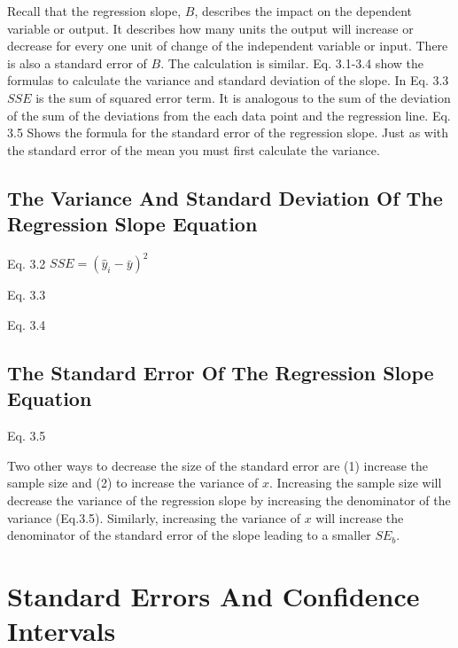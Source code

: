 \documentclass[]{book}
\theoremstyle{definition}
\theoremstyle{definition}
\theoremstyle{definition}
\theoremstyle{remark}
\begin{document}
Recall that the regression slope, \(B\), describes the impact on the
dependent variable or output. It describes how many units the output
will increase or decrease for every one unit of change of the
independent variable or input. There is also a standard error of \(B\).
The calculation is similar. Eq. 3.1-3.4 show the formulas to calculate
the variance and standard deviation of the slope. In Eq. 3.3 \(SSE\) is
the sum of squared error term. It is analogous to the sum of the
deviation of the sum of the deviations from the each data point and the
regression line. Eq. 3.5 Shows the formula for the standard error of the
regression slope. Just as with the standard error of the mean you must
first calculate the variance.

\hypertarget{the-variance-and-standard-deviation-of-the-regression-slope-equation}{%
\subsection{The Variance And Standard Deviation Of The Regression Slope
Equation}\label{the-variance-and-standard-deviation-of-the-regression-slope-equation}}

Eq. 3.2 \(SSE = ({\hat{y}_i} - \bar{y})^2\)

Eq. 3.3

Eq. 3.4

\hypertarget{the-standard-error-of-the-regression-slope-equation}{%
\subsection{The Standard Error Of The Regression Slope
Equation}\label{the-standard-error-of-the-regression-slope-equation}}

Eq. 3.5

Two other ways to decrease the size of the standard error are (1)
increase the sample size and (2) to increase the variance of \(x\).
Increasing the sample size will decrease the variance of the regression
slope by increasing the denominator of the variance (Eq.3.5). Similarly,
increasing the variance of \(x\) will increase the denominator of the
standard error of the slope leading to a smaller \(SE_b\).

\hypertarget{standard-errors-and-confidence-intervals}{%
\section{Standard Errors And Confidence
Intervals}\label{standard-errors-and-confidence-intervals}}
\end{document}
